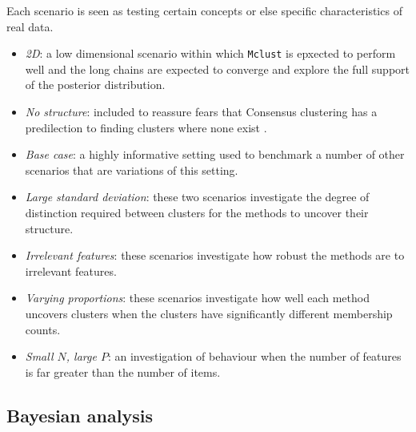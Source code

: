 \documentclass[]{article}
\begin{document}
Each scenario is seen as testing certain concepts or else specific characteristics of real data. 
\begin{itemize}
	\item \emph{2D}: a low dimensional scenario within which \texttt{Mclust} is epxected to perform well and the long chains are expected to converge and explore the full support of the posterior distribution.
	\item \emph{No structure}: included to reassure fears that Consensus clustering has a predilection to finding clusters where none exist \citep{senbabaoglu2014reassessment,senbabaouglu2014critical}.
	\item \emph{Base case}: a highly informative setting used to benchmark a number of other scenarios that are variations of this setting.
	\item \emph{Large standard deviation}: these two scenarios investigate the degree of distinction required between clusters for the methods to uncover their structure.
	\item \emph{Irrelevant features}: these scenarios investigate how robust the methods are to irrelevant features.
	\item \emph{Varying proportions}: these scenarios investigate how well each method uncovers clusters when the clusters have significantly different membership counts.
	\item \emph{Small $N$, large $P$}: an investigation of behaviour when the number of features is far greater than the number of items.
\end{itemize}

\subsection{Bayesian analysis} \label{sec:simBayesianAnalysis}
\end{document}
